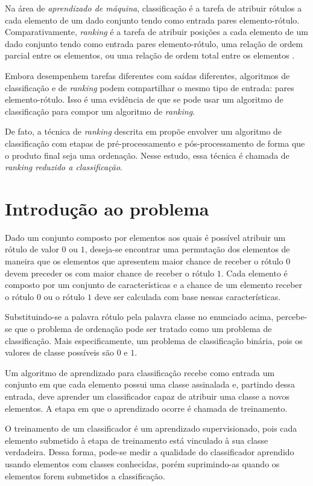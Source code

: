 Na área de \emph{aprendizado de máquina}, classificação é a tarefa de atribuir rótulos a cada elemento de um dado conjunto tendo como entrada pares elemento-rótulo. Comparativamente, \emph{ranking} é a tarefa de atribuir posições a cada elemento de um dado conjunto tendo como entrada pares elemento-rótulo, uma relação de ordem parcial entre os elementos, ou uma relação de ordem total entre os elementos \cite{tieyan09}.

Embora desempenhem tarefas diferentes com saídas diferentes, algoritmos de classificação e de \emph{ranking} podem compartilhar o mesmo tipo de entrada: pares elemento-rótulo. Isso é uma evidência de que se pode usar um algoritmo de classificação para compor um algoritmo de \emph{ranking}.

De fato, a técnica de \emph{ranking} descrita em \cite{langford08} propõe envolver  um algoritmo de classificação com etapas de pré-processamento e pós-processamento de forma que o produto final seja uma ordenação. Nesse estudo, essa técnica é chamada de \emph{ranking reduzido a classificação}.

\section{Introdução ao problema}

Dado um conjunto composto por elementos aos quais é possível atribuir um rótulo de valor $0$ ou $1$, deseja-se encontrar uma permutação dos elementos de maneira que os elementos que apresentem maior chance de receber o rótulo $0$ devem preceder os com maior chance de receber o rótulo $1$. Cada elemento é composto por um conjunto de características e a chance de um elemento receber o rótulo $0$ ou o rótulo $1$ deve ser calculada com base nessas características.

Substituindo-se a palavra rótulo pela palavra classe no enunciado acima, percebe-se que o problema de ordenação pode ser tratado como um problema de classificação. Mais especificamente, um problema de classificação binária, pois os valores de classe possíveis são $0$ e $1$.

Um algoritmo de aprendizado para classificação recebe como entrada um conjunto em que cada elemento possui uma classe assinalada e, partindo dessa entrada, deve aprender um classificador capaz de atribuir uma classe a novos elementos. A etapa em que o aprendizado ocorre é chamada de treinamento.

O treinamento de um classificador é um aprendizado supervisionado, pois cada elemento submetido à etapa de treinamento está vinculado à sua classe verdadeira. Dessa forma, pode-se medir a qualidade do classificador aprendido usando elementos com classes conhecidas, porém suprimindo-as quando os elementos forem submetidos a classificação.

